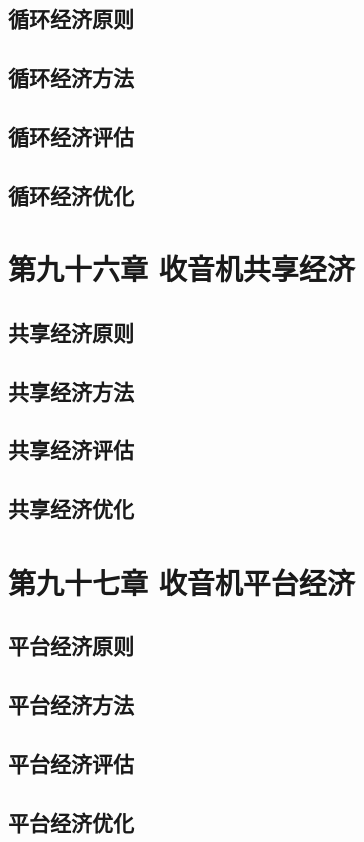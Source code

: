 \documentclass[12pt,UTF8]{ctexbook}
\begin{document}
\section{循环经济原则}
\section{循环经济方法}
\section{循环经济评估}
\section{循环经济优化}

\chapter{第九十六章 收音机共享经济}

\section{共享经济原则}
\section{共享经济方法}
\section{共享经济评估}
\section{共享经济优化}

\chapter{第九十七章 收音机平台经济}

\section{平台经济原则}
\section{平台经济方法}
\section{平台经济评估}
\section{平台经济优化}
\end{document}
